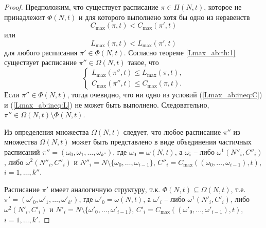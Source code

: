 \begin{proof}
Предположим, что существует расписание $\pi \in \Pi(N,t)$, которое не принадлежит $\Phi(N,t)$ и для которого выполнено хотя бы одно из неравенств
\begin{equation}\label{Lmax_ab:ineq:C}
C_{\max}(\pi,t) < C_{\max}(\pi',t)
\end{equation}
или
\begin{equation}\label{Lmax_ab:ineq:L}
L_{\max}(\pi,t) < L_{\max}(\pi',t)
\end{equation}
для любого расписания $\pi' \in \Phi(N,t)$. Согласно теореме \ref{Lmax_ab:th:1} существует расписание $\pi'' \in \Omega(N, t)$ такое, что
\begin{equation*}
    \begin{cases}
        L_{\max}(\pi'',t) \leq L_{\max}(\pi,t),\\
        C_{\max}(\pi'',t) \leq C_{\max}(\pi,t).
    \end{cases}
\end{equation*}
Если $\pi'' \in \Phi(N,t)$, тогда очевидно, что ни одно из условий (\ref{Lmax_ab:ineq:C}) и (\ref{Lmax_ab:ineq:L}) не может быть выполнено. Следовательно, $\pi'' \in \Omega(N,t) \setminus \Phi(N,t)$.

Из определения множества $\Omega(N,t)$ следует, что любое расписание $\pi''$ из множества $\Omega(N,t)$ может быть представлено в виде объединения частичных расписаний $\pi'' = (\omega_0,\omega_1, \dots , \omega_{k''})$, где $\omega_0 = \omega(N,t)$, а $\omega_i$ -- либо $\omega^1(N''_i,C''_i)$, либо $\omega^2(N''_i,C''_i)$ и $N''_i = N \setminus \{\omega_0, \dots , \omega_{i-1}\}$, $C''_i = C_{\max}((\omega_0, \dots , \omega_{i - 1}), t)$, $i = 1, \dots , k''$.

Расписание $\pi'$ имеет аналогичную структуру, т.к. $\Phi(N,t) \subseteq \Omega(N,t)$, т.е.
 $\pi' = (\omega'_0,\omega'_1, \dots , \omega'_{k'})$, где $\omega'_0 = \omega(N,t)$, а $\omega'_i$ -- либо $\omega^1(N'_i,C'_i)$, либо $\omega^2(N'_i,C'_i)$ и $N'_i = N \setminus \{\omega'_0, \dots , \omega'_{i-1}\}$, $C'_i = C_{\max}((\omega'_0, \dots , \omega'_{i - 1}), t)$, $i = 1,  \dots , k'$.


\end{proof}
